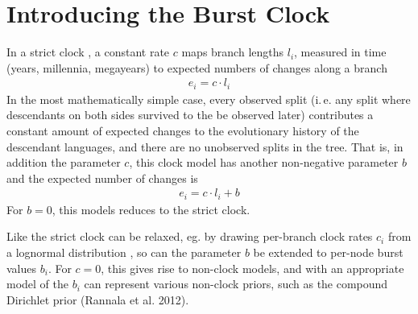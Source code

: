 \documentclass[a4paper,12pt]{scrartcl}
\begin{document}
\section{Introducing the Burst Clock}
\label{sec:description}
In a strict clock \parencite{}, a constant rate $c$ maps branch lengths $l_i$,
measured in time (years, millennia, megayears) to expected numbers of changes
along a branch
\begin{align}
  e_i = c \cdot l_i
  \label{eq:strict}
\end{align}
In the most mathematically simple case,
every observed split (i.\,e. any split where descendants on both sides survived
to the be observed later) contributes a constant amount of expected changes to
the evolutionary history of the descendant languages, and there are no
unobserved splits in the tree.
That is, in addition the parameter $c$, this clock model has another
non-negative parameter $b$ and the expected number of changes is 
\begin{align}
  e_i = c \cdot l_i + b
  \label{eq:simple-burst}
\end{align}
For $b=0$, this models reduces to the strict clock.

Like the strict clock can be relaxed, eg. by drawing per-branch clock rates $c_i$ from
a lognormal distribution \parencite{}, so can the parameter $b$ be extended to
per-node burst values $b_i$. For $c=0$, this gives rise to non-clock models, and
with an appropriate model of the $b_i$ can represent various non-clock priors,
such as the compound Dirichlet prior (Rannala et al. 2012).
\end{document}
